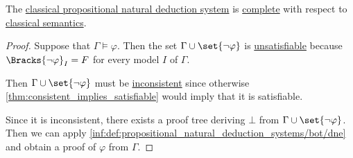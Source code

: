 \begin{theorem}\label{thm:classical_propositional_completeness}
  The \hyperref[def:propositional_natural_deduction_systems]{classical propositional natural deduction system} is \hyperref[def:abstract_logic/completeness]{complete} with respect to \hyperref[def:propositional_semantics/classical]{classical semantics}.
\end{theorem}
\begin{proof}
  Suppose that \( \Gamma \vDash \varphi \). Then the set \( \Gamma \cup \set{ \neg \varphi } \) is \hyperref[def:satisfiable_set_of_sentences]{unsatisfiable} because \( \Bracks{\neg \varphi}_I = F \) for every model \( I \) of \( \Gamma \).

  Then \( \Gamma \cup \set{ \neg \varphi } \) must be \hyperref[def:consistent_set_of_sentences]{inconsistent} since otherwise \cref{thm:consistent_implies_satisfiable} would imply that it is satisfiable.

  Since it is inconsistent, there exists a proof tree deriving \( \bot \) from \( \Gamma \cup \set{ \neg \varphi } \). Then we can apply \ref{inf:def:propositional_natural_deduction_systems/bot/dne} and obtain a proof of \( \varphi \) from \( \Gamma \).
\end{proof}
